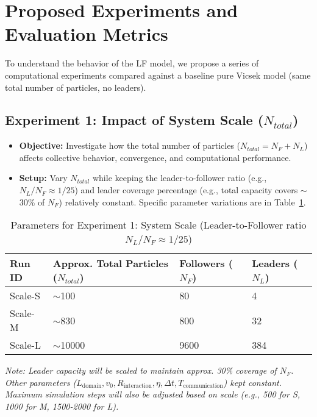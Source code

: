 \documentclass[11pt]{article}
\begin{document}
\section{Proposed Experiments and Evaluation Metrics}
To understand the behavior of the LF model, we propose a series of computational experiments compared against a baseline pure Vicsek model (same total number of particles, no leaders).

\subsection{Experiment 1: Impact of System Scale ($N_{total}$)}
\begin{itemize}
    \item \textbf{Objective:} Investigate how the total number of particles ($N_{total} = N_F + N_L$) affects collective behavior, convergence, and computational performance.
    \item \textbf{Setup:} Vary $N_{total}$ while keeping the leader-to-follower ratio (e.g., $N_L/N_F \approx 1/25$) and leader coverage percentage (e.g., total capacity covers $\sim$30\% of $N_F$) relatively constant. Specific parameter variations are in Table~\ref{tab:exp1_params}.
\end{itemize}
\begin{table}[H]
    \centering
    \caption{Parameters for Experiment 1: System Scale (Leader-to-Follower ratio $N_L/N_F \approx 1/25$)}
    \label{tab:exp1_params}
    \begin{tabular}{llll}
        \toprule
        Run ID & Approx. Total Particles ($N_{total}$) & Followers ($N_F$) & Leaders ($N_L$) \\
        \midrule
        Scale-S & $\sim$100  & 80  & 4   \\ %
        Scale-M & $\sim$830 & 800 & 32  \\ %
        Scale-L & $\sim$10000& 9600& 384 \\ %
        \bottomrule
    \end{tabular}
    \parbox{\textwidth}{\footnotesize \textit{Note: Leader capacity will be scaled to maintain approx. 30\% coverage of $N_F$. Other parameters ($L_{\text{domain}}, v_0, R_{\text{interaction}}, \eta, \Delta t, T_{\text{communication}}$) kept constant. Maximum simulation steps will also be adjusted based on scale (e.g., 500 for S, 1000 for M, 1500-2000 for L).}}
\end{table}
\end{document}
